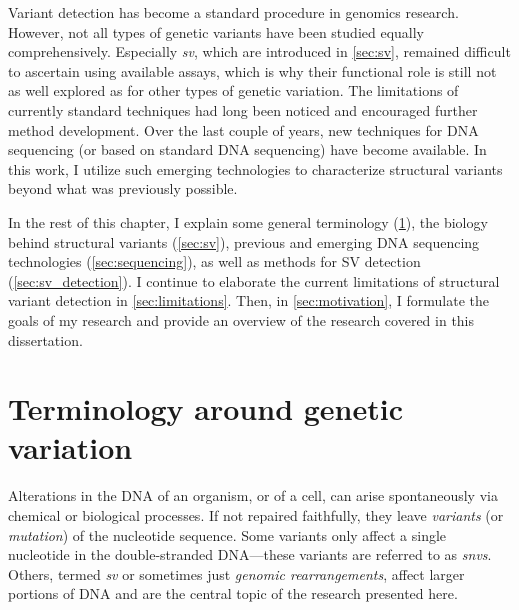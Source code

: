 Variant detection has become a standard procedure in genomics research. However,
not all types of genetic variants have been studied equally comprehensively.
Especially \emph{\acf{sv}}, which are introduced in \cref{sec:sv}, remained
difficult to ascertain using available assays, which is why their functional
role is still not as well explored as for other types of genetic variation. The
limitations of currently standard techniques had long been noticed and
encouraged further method development. Over the last couple of years, new
techniques for DNA sequencing (or based on standard DNA sequencing) have become
available. In this work, I utilize such emerging technologies to characterize
structural variants beyond what was previously possible.

In the rest of this chapter, I explain some general terminology
(\cref{sec:variation}), the biology behind structural variants
(\cref{sec:sv}), previous and emerging DNA sequencing technologies
(\cref{sec:sequencing}), as well as methods for SV detection
(\cref{sec:sv_detection}). I continue to elaborate the current limitations
of structural variant detection in \cref{sec:limitations}. Then, in
\cref{sec:motivation}, I formulate the goals of my research and provide an
overview of the research covered in this dissertation.






\section{Terminology around genetic variation}
\label{sec:variation}

Alterations in the DNA of an organism, or of a cell, can arise spontaneously
via chemical or biological processes. If not repaired faithfully, they leave
\emph{variants} (or \emph{mutation}) of the nucleotide sequence. Some variants
only affect a single nucleotide in the double-stranded DNA---these variants are
referred to as \emph{\acfp{snv}}. Others, termed \emph{\acf{sv}} or sometimes
just \emph{genomic rearrangements}, affect larger portions of DNA and are the
central topic of the research presented here.

